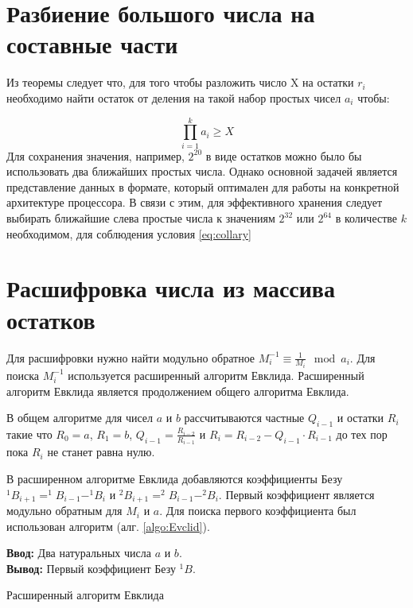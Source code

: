 \documentclass[10pt]{article}
\begin{document}
\section{Разбиение большого числа на составные части}

Из теоремы следует что, для того чтобы разложить число X на остатки $r_i$ необходимо найти остаток от деления на такой набор простых чисел $a_i$ чтобы:

\begin{equation}
	\prod\limits_{i=1}^k a_i \geqslant X
	\label{eq:collary}
\end{equation}
Для сохранения значения, например, $2^{20}$ в виде остатков можно было бы использовать два ближайших простых числа. Однако основной задачей является представление данных в формате, который оптимален для работы на конкретной архитектуре процессора. В связи с этим, для эффективного хранения следует выбирать ближайшие слева простые числа к значениям $2^{32}$ или $2^{64}$ в количестве $k$ необходимом, для соблюдения условия \ref{eq:collary} 

\section{Расшифровка числа из массива остатков}

Для расшифровки нужно найти модульно обратное $M_i^{-1}\equiv\frac{1}{M_i}\mod a_i$. Для поиска $M_i^{-1}$ используется расширенный алгоритм Евклида.
Расширенный алгоритм Евклида \cite{Okulov2011} является продолжением общего алгоритма Евклида. 

В общем алгоритме для чисел $a$ и $b$ рассчитываются частные $Q_{i-1}$ и остатки $R_i$ такие что $R_0 = a$, $R_1 = b$, $Q_{i-1} = \frac{R_{i-2}}{R_{i-1}}$ и $R_i = R_{i-2} - Q_{i-1} \cdot R_{i-1}$ до тех пор пока $R_i$ не станет равна нулю.

В расширенном алгоритме Евклида добавляются коэффициенты Безу $^1B_{i+1} = ^1B_{i-1} - ^1B_{i}$ и $^2B_{i+1} = ^2B_{i-1} - ^2B_{i}$. Первый коэффициент является модульно обратным для $M_i$ и $a$. Для поиска первого коэффициента был использован алгоритм (алг. \ref{algo:Evclid}).


\begin{algorithm}[H]
	\textbf{Ввод:} Два натуральных числа $a$ и $b$.\\
	\textbf{Вывод:} Первый коэффициент Безу $^1B$.
	\begin{algorithmic}
		\ENDWHILE {}
	\end{algorithmic}
	\caption{Расширенный алгоритм Евклида}
	\label{algo:Evclid}
\end{algorithm}
\end{document}
